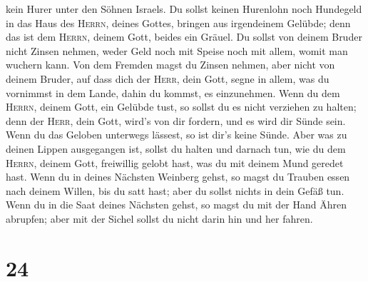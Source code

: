 kein Hurer unter den Söhnen Israels.  Du sollst keinen
Hurenlohn noch Hundegeld in das Haus des \textsc{Herrn}, deines Gottes,
bringen aus irgendeinem Gelübde; denn das ist dem \textsc{Herrn}, deinem
Gott, beides ein Gräuel.  Du sollst von deinem Bruder
nicht Zinsen nehmen, weder Geld noch mit Speise noch mit allem, womit
man wuchern kann.  Von dem Fremden magst du Zinsen
nehmen, aber nicht von deinem Bruder, auf dass dich der \textsc{Herr},
dein Gott, segne in allem, was du vornimmst in dem Lande, dahin du
kommst, es einzunehmen.  Wenn du dem \textsc{Herrn},
deinem Gott, ein Gelübde tust, so sollst du es nicht verziehen zu
halten; denn der \textsc{Herr}, dein Gott, wird's von dir fordern, und
es wird dir Sünde sein.  Wenn du das Geloben unterwegs
lässest, so ist dir's keine Sünde.  Aber was zu deinen
Lippen ausgegangen ist, sollst du halten und darnach tun, wie du dem
\textsc{Herrn}, deinem Gott, freiwillig gelobt hast, was du mit deinem
Mund geredet hast.  Wenn du in deines Nächsten Weinberg
gehst, so magst du Trauben essen nach deinem Willen, bis du satt hast;
aber du sollst nichts in dein Gefäß tun.  Wenn du in die
Saat deines Nächsten gehst, so magst du mit der Hand Ähren abrupfen;
aber mit der Sichel sollst du nicht darin hin und her fahren.

\hypertarget{section-23}{%
\section{24}\label{section-23}}


